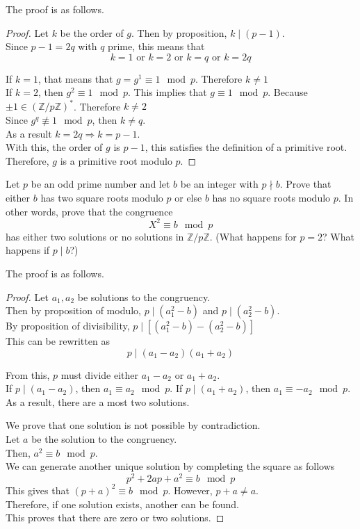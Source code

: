 \documentclass[12pt]{article}
\begin{document}
\solution The proof is as follows.
\begin{proof}
    Let $k$ be the order of $g$. Then by proposition, $k\mid (p-1)$.\\
    Since $p-1=2q$ with $q$ prime, this means that
    \[k=1\text{ or } k=2 \text{ or } k=q \text{ or } k=2q\]

    \noindent
    If $k=1$, that means that $g=g^1\equiv1\mod{p}$. Therefore $k\neq1$\\
    If $k=2$, then $g^2\equiv1\mod{p}$. This implies that $g\equiv1\mod{p}$. Because $\pm1\in(\mathbb{Z}/p\mathbb{Z})^*$. Therefore $k\neq2$\\
    Since $g^q\not\equiv1\mod{p}$, then $k\neq q$.\\
    As a result $k=2q\Rightarrow k=p-1$.\\
    With this, the order of $g$ is $p-1$, this satisfies the definition of a primitive root.\\
    Therefore, $g$ is a primitive root modulo $p$.
\end{proof}

\newpage
\problem Let $p$ be an odd prime number and let $b$ be an integer with $p\nmid b$. Prove that either $b$ has two square roots modulo $p$ or else $b$ has no square roots modulo $p$. In other words, prove that the congruence
\[X^2\equiv b\mod{p}\]
has either two solutions or no solutions in $\mathbb{Z}/p\mathbb{Z}$. (What happens for $p=2$? What happens if $p\mid b$?)

\solution The proof is as follows.
\begin{proof}
    Let $a_1,a_2$ be solutions to the congruency.\\
    Then by proposition of modulo, $p\mid\left(a_1^2-b\right)$ and $p\mid\left(a_2^2-b\right)$.\\
    By proposition of divisibility, $p\mid\left[\left(a_1^2-b\right)-\left(a_2^2-b\right)\right]$\\
    This can be rewritten as
    \[p\mid(a_1-a_2)(a_1+a_2)\]

    \noindent
    From this, $p$ must divide either $a_1-a_2$ or $a_1+a_2$.\\
    If $p\mid(a_1-a_2)$, then $a_1\equiv a_2\mod{p}$. If $p\mid(a_1+a_2)$, then $a_1\equiv-a_2\mod{p}$.\\
    As a result, there are a most two solutions.

    \noindent
    We prove that one solution is not possible by contradiction.\\
    Let $a$ be the solution to the congruency.\\
    Then, $a^2\equiv b\mod{p}$.\\
    We can generate another unique solution by completing the square as follows
    \[p^2+2ap+a^2\equiv b\mod{p}\]
    This gives that $(p+a)^2\equiv b\mod{p}$. However, $p+a\not=a$.\\
    Therefore, if one solution exists, another can be found.\\
    This proves that there are zero or two solutions.
\end{proof}
\end{document}
